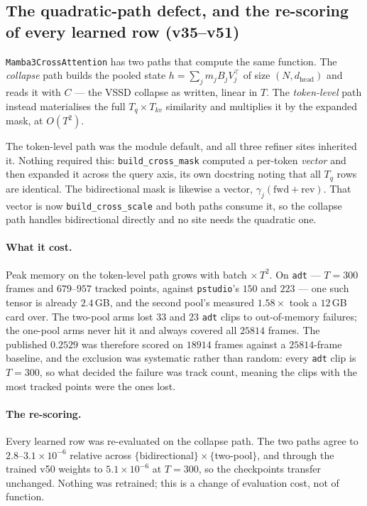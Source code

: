\documentclass[11pt,a4paper]{article}
\begin{document}
\subsection{The quadratic-path defect, and the re-scoring of every learned row (v35--v51)}
\label{sec:collapse-reeval}

\texttt{Mamba3CrossAttention} has two paths that compute the same function. The \emph{collapse}
path builds the pooled state $h=\sum_j m_j B_j V_j^{\top}$ of size $(N,d_\mathrm{head})$ and reads
it with $C$ --- the VSSD collapse as written, linear in $T$. The \emph{token-level} path instead
materialises the full $T_q\times T_{kv}$ similarity and multiplies it by the expanded mask, at
$O(T^2)$.

The token-level path was the module default, and all three refiner sites inherited it. Nothing
required this: \texttt{build\_cross\_mask} computed a per-token \emph{vector} and then expanded it
across the query axis, its own docstring noting that all $T_q$ rows are identical. The
bidirectional mask is likewise a vector, $\gamma_j(\mathrm{fwd}+\mathrm{rev})$. That vector is now
\texttt{build\_cross\_scale} and both paths consume it, so the collapse path handles bidirectional
directly and no site needs the quadratic one.

\paragraph{What it cost.} Peak memory on the token-level path grows with batch $\times\,T^2$. On
\texttt{adt} --- $T=300$ frames and $679$--$957$ tracked points, against \texttt{pstudio}'s $150$
and $223$ --- one such tensor is already $2.4$\,GB, and the second pool's measured $1.58\times$ took
a $12$\,GB card over. The two-pool arms lost $33$ and $23$ \texttt{adt} clips to out-of-memory
failures; the one-pool arms never hit it and always covered all $25814$ frames. The published
$0.2529$ was therefore scored on $18914$ frames against a $25814$-frame baseline, and the exclusion
was systematic rather than random: every \texttt{adt} clip is $T=300$, so what decided the failure
was track count, meaning the clips with the most tracked points were the ones lost.

\paragraph{The re-scoring.} Every learned row was re-evaluated on the collapse path. The two paths
agree to $2.8$--$3.1\times10^{-6}$ relative across $\{$bidirectional$\}\times\{$two-pool$\}$, and
through the trained v50 weights to $5.1\times10^{-6}$ at $T=300$, so the checkpoints transfer
unchanged. Nothing was retrained; this is a change of evaluation cost, not of function.
\end{document}
